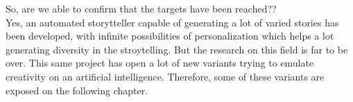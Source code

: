 So, are we able to confirm that the targets have been reached??\\
Yes, an automated storytteller capable of generating a lot of varied stories has been developed, with infinite possibilities of personalization which helps a lot generating diversity in the stroytelling.
But the research on this field is far to be over. This same project has open a lot of new variants trying to emulate creativity on an artificial intelligence. Therefore, some of these variants are exposed on the following chapter.




